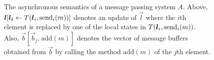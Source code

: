 \begin{figure} [t]
\footnotesize{
  \centering
  \begin{mathpar}
    
    
  \end{mathpar}
  }
  \caption{The asynchronous semantics of a message passing system $A$. Above, $\vec{l}[\vec{l_i}\gets T(\vec{l}_i,\send{i}{m})]$ denotes an update of $\vec{l}$ where the $i$th element is replaced by one of the local states in $T(\vec{l}_i,\send{i}{m})$. Also, $\vec{b}[\vec{b}_j.\ \mathrm{add}(m)]$ denotes the vector of message buffers obtained from $\vec{b}$ by calling the method $\mathrm{add}(m)$ of the $j$th element.
  }
  \label{fig:asynch-sem}
\end{figure}


